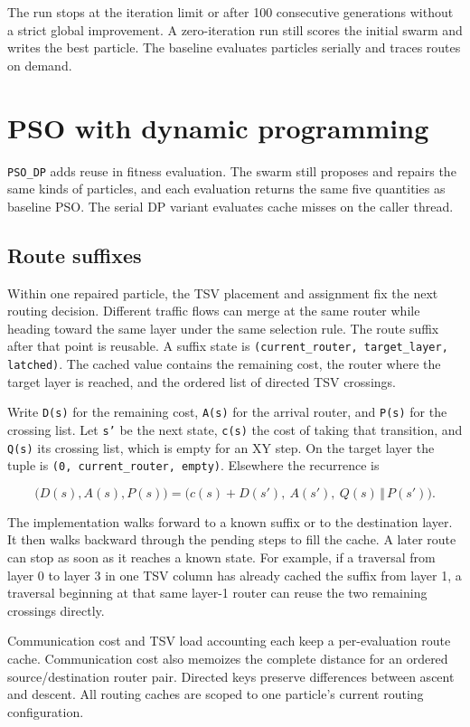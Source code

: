\documentclass[11pt,a4paper]{article}
\begin{document}
The run stops at the iteration limit or after 100 consecutive generations without a strict global improvement. A zero-iteration run still scores the initial swarm and writes the best particle. The baseline evaluates particles serially and traces routes on demand.

\section{PSO with dynamic programming}

\texttt{PSO\_DP} adds reuse in fitness evaluation. The swarm still proposes and repairs the same kinds of particles, and each evaluation returns the same five quantities as baseline PSO. The serial DP variant evaluates cache misses on the caller thread.

\subsection{Route suffixes}

Within one repaired particle, the TSV placement and assignment fix the next routing decision. Different traffic flows can merge at the same router while heading toward the same layer under the same selection rule. The route suffix after that point is reusable. A suffix state is \texttt{(current\_router, target\_layer, latched)}. The cached value contains the remaining cost, the router where the target layer is reached, and the ordered list of directed TSV crossings.

Write \texttt{D(s)} for the remaining cost, \texttt{A(s)} for the arrival router, and \texttt{P(s)} for the crossing list. Let \texttt{s'} be the next state, \texttt{c(s)} the cost of taking that transition, and \texttt{Q(s)} its crossing list, which is empty for an XY step. On the target layer the tuple is \texttt{(0, current\_router, empty)}. Elsewhere the recurrence is

\[
\bigl(D(s), A(s), P(s)\bigr)
  = \bigl(c(s)+D(s'),\ A(s'),\ Q(s)\,\Vert\,P(s')\bigr).
\]

The implementation walks forward to a known suffix or to the destination layer. It then walks backward through the pending steps to fill the cache. A later route can stop as soon as it reaches a known state. For example, if a traversal from layer 0 to layer 3 in one TSV column has already cached the suffix from layer 1, a traversal beginning at that same layer-1 router can reuse the two remaining crossings directly.

Communication cost and TSV load accounting each keep a per-evaluation route cache. Communication cost also memoizes the complete distance for an ordered source/destination router pair. Directed keys preserve differences between ascent and descent. All routing caches are scoped to one particle's current routing configuration.
\end{document}
